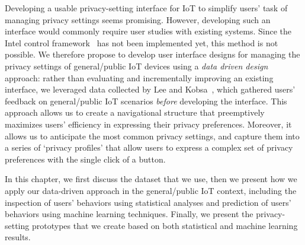 

Developing a usable privacy-setting interface for IoT to simplify users' task of managing privacy settings seems promising. However, developing such an interface would commonly require user studies with existing systems. Since the Intel control framework~\cite{chow2015hci} has not been implemented yet, this method is not possible. We therefore propose to develop user interface designs for managing the privacy settings of general/public IoT devices using a \emph{data driven design} approach: rather than evaluating and incrementally improving an existing interface, we leveraged data collected by Lee and Kobsa~\cite{lee2016understanding}, which gathered users' feedback on general/public IoT scenarios \emph{before} developing the interface. This approach allows us to create a navigational structure that preemptively maximizes users' efficiency in expressing their privacy preferences. Moreover, it allows us to anticipate the most common privacy settings, and capture them into a series of `privacy profiles' that allow users to express a complex set of privacy preferences with the single click of a button.

In this chapter, we first discuss the dataset that we use, then we present how we apply our data-driven approach in the general/public IoT context, including the inspection of users' behaviors using statistical analyses and prediction of users' behaviors using machine learning techniques. Finally, we present the privacy-setting prototypes that we create based on both statistical and machine learning results.

